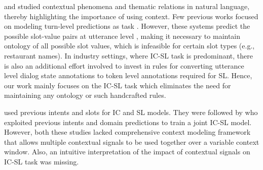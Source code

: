 \citet{dahlback1989empirical} and \citet{bertomeu2006contextual} studied contextual phenomena and thematic relations in
natural language,
thereby highlighting the importance of using context. %
Few previous works focused on modeling turn-level predictions as  task \cite{williams2013dialog}. However, these systems 
predict the possible slot-value pairs at utterance level \cite{glad}, making it necessary to maintain ontology of all possible slot values, which is infeasible for certain slot types (e.g., restaurant names). In industry settings, where IC-SL task is predominant, there is also an additional effort involved to invest in rules for converting utterance level dialog state annotations to token level annotations required for SL. %
Hence, our work mainly focuses on the IC-SL task which eliminates the need for maintaining any ontology or such handcrafted rules.

\citet{Bhargava2013EasyCI} used previous intents and slots for IC and SL models. They were followed by \citet{Shi2015ContextualSL} who exploited previous intents and domain predictions to train a joint IC-SL model. However, both these studies lacked comprehensive context modeling framework that allows multiple contextual signals to be used together over a variable context window. %
Also, an intuitive interpretation of the impact of contextual signals on IC-SL task was missing.




